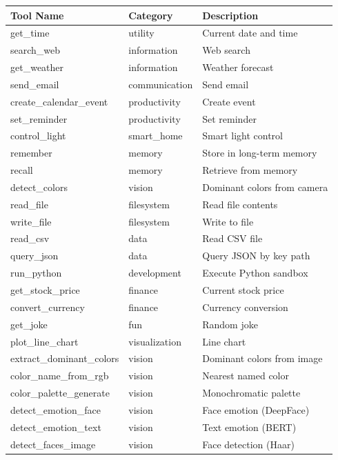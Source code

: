 \documentclass[12pt,a4paper,twoside]{report}
\begin{document}
\begin{longtable}{|l|l|l|}
\hline
\rowcolor{phiblue!20}
\textbf{Tool Name} & \textbf{Category} & \textbf{Description} \\
\hline
\endhead
get\_time & utility & Current date and time \\
\hline
search\_web & information & Web search \\
\hline
get\_weather & information & Weather forecast \\
\hline
send\_email & communication & Send email \\
\hline
create\_calendar\_event & productivity & Create event \\
\hline
set\_reminder & productivity & Set reminder \\
\hline
control\_light & smart\_home & Smart light control \\
\hline
remember & memory & Store in long-term memory \\
\hline
recall & memory & Retrieve from memory \\
\hline
detect\_colors & vision & Dominant colors from camera \\
\hline
read\_file & filesystem & Read file contents \\
\hline
write\_file & filesystem & Write to file \\
\hline
read\_csv & data & Read CSV file \\
\hline
query\_json & data & Query JSON by key path \\
\hline
run\_python & development & Execute Python sandbox \\
\hline
get\_stock\_price & finance & Current stock price \\
\hline
convert\_currency & finance & Currency conversion \\
\hline
get\_joke & fun & Random joke \\
\hline
plot\_line\_chart & visualization & Line chart \\
\hline
extract\_dominant\_colors & vision & Dominant colors from image \\
\hline
color\_name\_from\_rgb & vision & Nearest named color \\
\hline
color\_palette\_generate & vision & Monochromatic palette \\
\hline
detect\_emotion\_face & vision & Face emotion (DeepFace) \\
\hline
detect\_emotion\_text & vision & Text emotion (BERT) \\
\hline
detect\_faces\_image & vision & Face detection (Haar) \\

\end{longtable}
\end{document}
